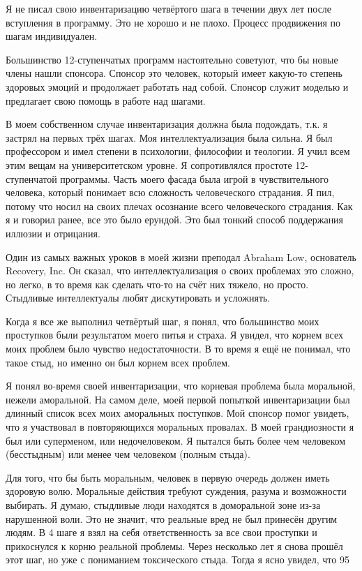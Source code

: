 \documentclass[10pt, fleqn]{article}
\begin{document}
Я не писал свою инвентаризацию четвёртого шага в течении двух лет после вступления в программу. Это не хорошо и не плохо. Процесс продвижения по шагам индивидуален.

Большинство 12-ступенчатых программ настоятельно советуют, что бы новые члены нашли спонсора. Спонсор это человек, который имеет какую-то степень здоровых эмоций и продолжает работать над собой. Спонсор служит моделью и предлагает свою помощь в работе над шагами.

В моем собственном случае инвентаризация должна была подождать, т.к. я застрял на первых трёх шагах. Моя интеллектуализация была сильна. Я был профессором и имел степени в психологии, философии и теологии. Я учил всем этим вещам на университетском уровне. Я сопротивлялся простоте 12-ступенчатой программы. Часть моего фасада была игрой в чувствительного человека, который понимает всю сложность человеческого страдания. Я пил, потому что носил на своих плечах осознание всего человеческого страдания. Как я и говорил ранее, все это было ерундой. Это был тонкий способ поддержания иллюзии и отрицания.

Один из самых важных уроков в моей жизни преподал Abraham Low, основатель Recovery, Inc. Он сказал, что интеллектуализация о своих проблемах это сложно, но легко, в то время как сделать что-то на счёт них тяжело, но просто. Стыдливые интеллектуалы любят дискутировать и усложнять.

Когда я все же выполнил четвёртый шаг, я понял, что большинство моих проступков были результатом моего питья и страха. Я увидел, что корнем всех моих проблем было чувство недостаточности. В то время я ещё не понимал, что такое стыд, но именно он был корнем всех проблем.

Я понял во-время своей инвентаризации, что корневая проблема была моральной, нежели аморальной. На самом деле, моей первой попыткой инвентаризации был длинный список всех моих аморальных поступков. Мой спонсор помог увидеть, что я участвовал в повторяющихся моральных провалах. В моей грандиозности я был или суперменом, или недочеловеком. Я пытался быть более чем человеком (бесстыдным) или менее чем человеком (полным стыда).


Для того, что бы быть моральным, человек в первую очередь должен иметь здоровую волю. Моральные действия требуют суждения, разума и возможности выбирать. Я думаю, стыдливые люди находятся в доморальной зоне из-за нарушенной воли. Это не значит, что реальные вред не был принесён другим людям. В 4 шаге я взял на себя ответственность за все свои проступки и прикоснулся к корню реальной проблемы. Через несколько лет я снова прошёл этот шаг, но уже с пониманием токсического стыда. Тогда я ясно увидел, что 95%
\end{document}
